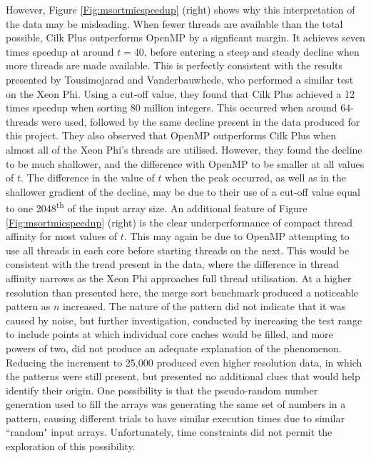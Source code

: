 \documentclass{report}
\begin{document}
However, Figure \ref{Fig:msortmicspeedup} (right) shows why this interpretation of the data may be misleading. When fewer threads are available than the total possible, Cilk Plus outperforms OpenMP by a signficant margin. It achieves seven times speedup at around \(t=40\), before entering a steep and steady decline when more threads are made available. This is perfectly consistent with the results presented by Tousimojarad and Vanderbauwhede\cite{Tousimojarad14}, who performed a similar test on the Xeon Phi. Using a cut-off value, they found that Cilk Plus achieved a 12 times speedup when sorting 80 million integers. This occurred when around 64-threads were used, followed by the same decline present in the data produced for this project. They also observed that OpenMP outperforms Cilk Plus when almost all of the Xeon Phi's threads are utilised. However, they found the decline to be much shallower, and the difference with OpenMP to be smaller at all values of \(t\). The difference in the value of \(t\) when the peak occurred, as well as in the shallower gradient of the decline, may be due to their use of a cut-off value  equal to one 2048\textsuperscript{th} of the input array size. An additional feature of Figure \ref{Fig:msortmicspeedup} (right) is the clear underperformance of compact thread affinity for most values of \(t\). This may again be due to OpenMP attempting to use all threads in each core before starting threads on the next. This would be consistent with the trend present in the data, where the difference in thread affinity narrows as the Xeon Phi approaches full thread utilisation. At a higher resolution than presented here, the merge sort benchmark produced a noticeable pattern as \(n\) increased. The nature of the pattern did not indicate that it was caused by noise, but further investigation, conducted by increasing the test range to include points at which individual core caches would be filled, and more powers of two, did not produce an adequate explanation of the phenomenon. Reducing the increment to 25,000 produced even higher resolution data, in which the patterns were still present, but presented no additional clues that would help identify their origin. One possibility is that the pseudo-random number generation used to fill the arrays was generating the same set of numbers in a pattern, causing different trials to have similar execution times due to similar ``random" input arrays. Unfortunately, time constraints did not permit the exploration of this possibility.
\end{document}
